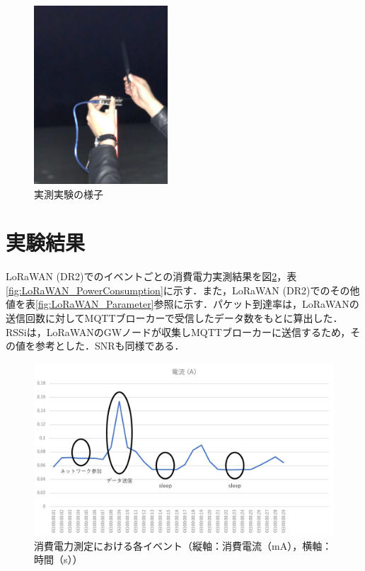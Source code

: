 \begin{figure}[]
    \begin{center}
    \includegraphics[width=5cm]{figures/experiment.jpg}
    \caption{実測実験の様子}
    \label{fig:experiment}
    \end{center}
\end{figure}

\section{実験結果}
LoRaWAN (DR2)でのイベントごとの消費電力実測結果を図\ref{fig:result_power_consumtion}，表\ref{fig:LoRaWAN_PowerConsumption}に示す．また，LoRaWAN (DR2)でのその他値を表\ref{fig:LoRaWAN_Parameter}参照に示す．パケット到達率は，LoRaWANの送信回数に対してMQTTブローカーで受信したデータ数をもとに算出した．RSSiは，LoRaWANのGWノードが収集しMQTTブローカーに送信するため，その値を参考とした．SNRも同様である．

\begin{figure}[]
    \begin{center}
    \includegraphics[width=15cm]{figures/LoRaWAN_消費電力実験.png}
    \caption{消費電力測定における各イベント（縦軸：消費電流（mA），横軸：時間（s））}
    \label{fig:result_power_consumtion}
    \end{center}
\end{figure}


